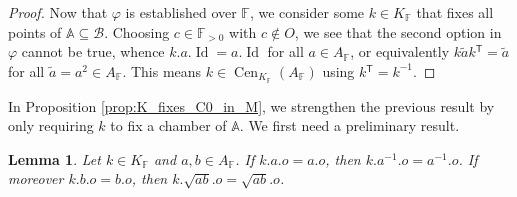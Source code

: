 \documentclass[12pt]{amsart}
\newcommand{\F}{\mathbb{F} }
\newcommand{\A}{\mathbb{A}}
\newcommand{\B}{\mathcal{B}}
\newcommand{\tran}{{^{\mathsf{T}}\!}}
\numberwithin{equation}{section}
\newtheorem{lemma}[theorem]{Lemma}
\theoremstyle{remark} %
\begin{document}
\begin{proof}
	Now that $\varphi$ is established over $\F$, we consider some $k \in K_\F$ that fixes all points of $\A \subseteq \B$. Choosing $c \in \F_{>0}$ with $c\notin O$, we see that the second option in $\varphi$ cannot be true, whence $k.a.\operatorname{Id} = a.\operatorname{Id}$ for all $a\in A_\F$, or equivalently $k\tilde{a}k\tran = \tilde{a}$ for all $\tilde{a}= a^2 \in A_\F$. This means $k \in \operatorname{Cen}_{K_\F}(A_\F)$ using $k\tran = k^{-1}$.
\end{proof}

In Proposition \ref{prop:K_fixes_C0_in_M}, we strengthen the previous result by only requiring $k$ to fix a chamber of $\A$. We first need a preliminary result.

\begin{lemma}\label{lem:K_fixing_pm_mean}
	Let $k\in K_\F$ and $a,b\in A_\F$. If $k.a.o = a.o$, then $k.a^{-1}.o = a^{-1}.o$. If moreover $k.b.o = b.o$, then $k.\sqrt{ab}.o = \sqrt{ab}.o$. 
\end{lemma}
\end{document}
